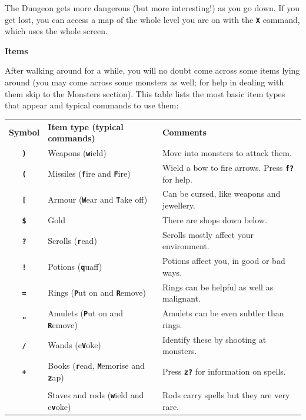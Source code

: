 \documentclass[a4paper,10pt]{article}
\newcommand{\key}[1]{{{\texttt{\textbf{#1}}}}} %
\newcommand{\sex}[1]{{{\textbf{#1}}}} %
\newcommand{\para}{\vspace{1.5ex}}
\begin{document}
The Dungeon gets more dangerous (but more interesting!) as you go down. If you 
get lost, you can access a map of the whole level you are on with the \key{X} 
command, which uses the whole screen. 

\para\para

\sex{Items} \para 

After walking around for a while, you will no doubt come across some items 
lying around (you may come across some monsters as well; for help in dealing 
with them skip to the Monsters section). This table lists the most basic item
types that appear and typical commands to use them:

\para

\begin{tabular}{cll}
\sex{Symbol} & \sex{Item type (typical commands)} & \sex{Comments} \\
\key{)}  & Weapons (\key{w}ield)                  & Move into monsters to attack them.\\
\key{(}  & Missiles (\key{f}ire and \key{F}ire)   & Wield a bow to fire arrows. Press \key{f?} for help.\\ 
\key{[}  & Armour (\key{W}ear and \key{T}ake off) & Can be cursed, like weapons and jewellery. \\
\key{\$} & Gold                                   & There are shops down below. \\
\key{?}  & Scrolls (\key{r}ead)                   & Scrolls mostly affect your environment.\\
\key{!}  & Potions (\key{q}uaff)                  & Potions affect you, in good or bad ways. \\
\key{=}  & Rings (\key{P}ut on and \key{R}emove)  & Rings can be helpful as well as malignant. \\
\key{"}  & Amulets (\key{P}ut on and \key{R}emove) & Amulets can be even subtler than rings. \\
\key{/}  & Wands (e\key{V}oke)                    & Identify these by shooting at monsters. \\
\key{+}  & Books (\key{r}ead, \key{M}emorise and \key{z}ap) & Press \key{z?} for information on spells.\\
\key{\char`\\} & Staves and rods (\key{w}ield and e\key{v}oke) \hspace{0.2em}
                                                  & Rods carry spells but they are very rare.
\end{tabular}
\end{document}
